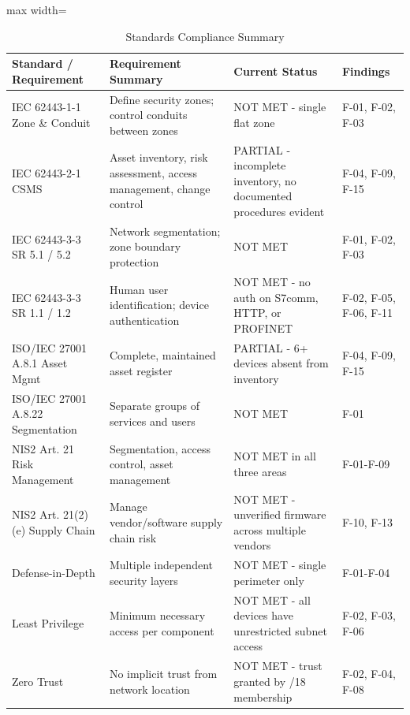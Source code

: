 \begin{table}[H]
\centering
\caption{Standards Compliance Summary}
\begin{adjustbox}{max width=\textwidth}
\begin{tabular}{@{}p{}p{}p{}p{}@{}}
\toprule
\textbf{Standard / Requirement} & \textbf{Requirement Summary} & \textbf{Current Status} & \textbf{Findings} \\
\midrule
IEC 62443-1-1 Zone \& Conduit & Define security zones; control conduits between zones & NOT MET - single flat zone & F-01, F-02, F-03 \\
IEC 62443-2-1 CSMS & Asset inventory, risk assessment, access management, change control & PARTIAL - incomplete inventory, no documented procedures evident & F-04, F-09, F-15 \\
IEC 62443-3-3 SR 5.1 / 5.2 & Network segmentation; zone boundary protection & NOT MET & F-01, F-02, F-03 \\
IEC 62443-3-3 SR 1.1 / 1.2 & Human user identification; device authentication & NOT MET - no auth on S7comm, HTTP, or PROFINET & F-02, F-05, F-06, F-11 \\
ISO/IEC 27001 A.8.1 Asset Mgmt & Complete, maintained asset register & PARTIAL - 6+ devices absent from inventory & F-04, F-09, F-15 \\
ISO/IEC 27001 A.8.22 Segmentation & Separate groups of services and users & NOT MET & F-01 \\
NIS2 Art. 21 Risk Management & Segmentation, access control, asset management & NOT MET in all three areas & F-01-F-09 \\
NIS2 Art. 21(2)(e) Supply Chain & Manage vendor/software supply chain risk & NOT MET - unverified firmware across multiple vendors & F-10, F-13 \\
Defense-in-Depth & Multiple independent security layers & NOT MET - single perimeter only & F-01-F-04 \\
Least Privilege & Minimum necessary access per component & NOT MET - all devices have unrestricted subnet access & F-02, F-03, F-06 \\
Zero Trust & No implicit trust from network location & NOT MET - trust granted by /18 membership & F-02, F-04, F-08 \\
\bottomrule
\end{tabular}
\end{adjustbox}
\end{table}
